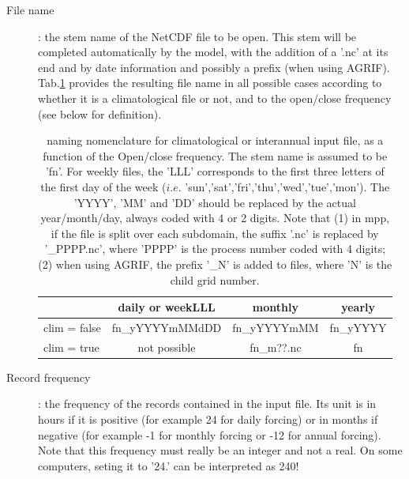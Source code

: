 \begin{description}  
\item[File name]: the stem name of the NetCDF file to be open. 
This stem will be completed automatically by the model, with the addition of a '.nc' at its end 
and by date information and possibly a prefix (when using AGRIF). 
Tab.\ref{Tab_fldread} provides the resulting file name in all possible cases according to whether 
it is a climatological file or not, and to the open/close frequency (see below for definition). 

\begin{table}[htbp] 
\begin{center}
\begin{tabular}{|l|c|c|c|}
\hline
                         & daily or weekLLL	        & monthly                   &   yearly          \\   \hline
clim = false	& fn\_yYYYYmMMdDD  &   fn\_yYYYYmMM   &   fn\_yYYYY  \\   \hline
clim = true	 	   & not possible 	              &  fn\_m??.nc             &   fn                \\   \hline
\end{tabular}
\end{center}
\caption{ \label{Tab_fldread}   naming nomenclature for climatological or interannual input file, 
as a function of the Open/close frequency. The stem name is assumed to be 'fn'. 
For weekly files, the 'LLL' corresponds to the first three letters of the first day of the week ($i.e.$ 'sun','sat','fri','thu','wed','tue','mon'). The 'YYYY', 'MM' and 'DD' should be replaced by the 
actual year/month/day, always coded with 4 or 2 digits. Note that (1) in mpp, if the file is split 
over each subdomain, the suffix '.nc' is replaced by '\_PPPP.nc', where 'PPPP' is the 
process number coded with 4 digits; (2) when using AGRIF, the prefix
'\_N' is added to files, 
where 'N'  is the child grid number.}
\end{table}
  

\item[Record frequency]: the frequency of the records contained in the input file. 
Its unit is in hours if it is positive (for example 24 for daily forcing) or in months if negative 
(for example -1 for monthly forcing or -12 for annual forcing). 
Note that this frequency must really be an integer and not a real. 
On some computers, seting it to '24.' can be interpreted as 240!


\end{description}
